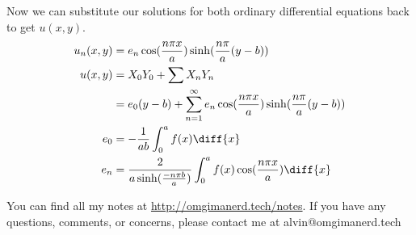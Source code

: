 \documentclass{math}
\begin{document}
Now we can substitute our solutions for both ordinary differential equations
back to get \( u(x,y) \).
\begin{align*}
  u_n(x,y) &= e_n\cos(\frac{n\pi x}{a})\sinh(\frac{n\pi}{a}(y-b)) \\
  u(x,y) &= X_0Y_0+\sum X_nY_n \\
  &= e_0(y-b)+\sum_{n=1}^{\infty}e_n\cos(\frac{n\pi x}{a})
    \sinh(\frac{n\pi}{a}(y-b)) \\
  e_0 &= -\frac{1}{ab}\int_{0}^{a}f(x)\diff{x} \\
  e_n &= \frac{2}{a\sinh(\frac{-n\pi b}{a})}
    \int_{0}^{a}f(x)\cos(\frac{n\pi x}{a})\diff{x}
\end{align*}

\begin{center}
  You can find all my notes at \url{http://omgimanerd.tech/notes}. If you have
  any questions, comments, or concerns, please contact me at
  alvin@omgimanerd.tech
\end{center}
\end{document}
